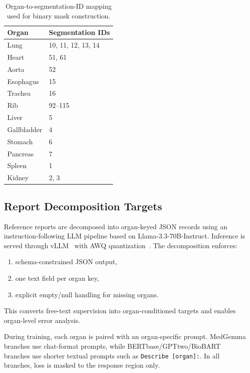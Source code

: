 \begin{table}[htbp]
    \centering
    \caption{Organ-to-segmentation-ID mapping used for binary mask construction.}
    \label{tab:organ_id_mapping}
    \begin{tabular}{ll}
        \toprule
        \textbf{Organ} & \textbf{Segmentation IDs} \\\midrule
        Lung & 10, 11, 12, 13, 14 \\
        Heart & 51, 61 \\
        Aorta & 52 \\
        Esophagus & 15 \\
        Trachea & 16 \\
        Rib & 92--115 \\
        Liver & 5 \\
        Gallbladder & 4 \\
        Stomach & 6 \\
        Pancreas & 7 \\
        Spleen & 1 \\
        Kidney & 2, 3 \\
        \bottomrule
    \end{tabular}
\end{table}

\subsection{Report Decomposition Targets}
Reference reports are decomposed into organ-keyed JSON records using an instruction-following LLM pipeline based on Llama-3.3-70B-Instruct. Inference is served through vLLM~\cite{kwon2023efficient} with \ac{AWQ} quantization~\cite{lin2023awq}. The decomposition enforces:
\begin{enumerate}
    \item schema-constrained JSON output,
    \item one text field per organ key,
    \item explicit empty/null handling for missing organs.
\end{enumerate}

This converts free-text supervision into organ-conditioned targets and enables organ-level error analysis.

During training, each organ is paired with an organ-specific prompt. MedGemma branches use chat-format prompts, while \ac{BERTbase}/\ac{GPTtwo}/BioBART branches use shorter textual prompts such as \texttt{Describe [organ]:}. In all branches, loss is masked to the response region only.

